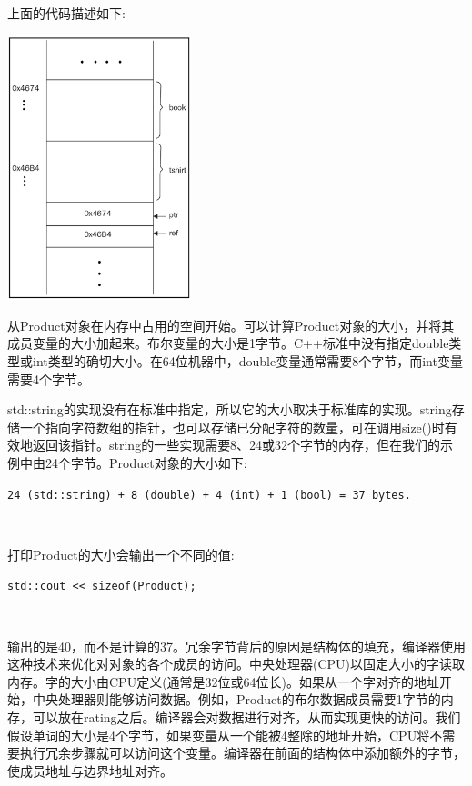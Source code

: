 上面的代码描述如下: \par

\begin{center}
	\includegraphics[width=0.4\textwidth]{content/Section-1/Chapter-3/2}
\end{center}

从Product对象在内存中占用的空间开始。可以计算Product对象的大小，并将其成员变量的大小加起来。布尔变量的大小是1字节。C++标准中没有指定double类型或int类型的确切大小。在64位机器中，double变量通常需要8个字节，而int变量需要4个字节。 \par
std::string的实现没有在标准中指定，所以它的大小取决于标准库的实现。string存储一个指向字符数组的指针，也可以存储已分配字符的数量，可在调用size()时有效地返回该指针。string的一些实现需要8、24或32个字节的内存，但在我们的示例中由24个字节。Product对象的大小如下:\par
	\texttt{24 (std::string) + 8 (double) + 4 (int) + 1 (bool) = 37 bytes.} \par

\noindent\textbf{}\ \par
打印Product的大小会输出一个不同的值: \par
	\texttt{std::cout << sizeof(Product);} \par
	
\noindent\textbf{}\ \par
输出的是40，而不是计算的37。冗余字节背后的原因是结构体的填充，编译器使用这种技术来优化对对象的各个成员的访问。中央处理器(CPU)以固定大小的字读取内存。字的大小由CPU定义(通常是32位或64位长)。如果从一个字对齐的地址开始，中央处理器则能够访问数据。例如，Product的布尔数据成员需要1字节的内存，可以放在rating之后。编译器会对数据进行对齐，从而实现更快的访问。我们假设单词的大小是4个字节，如果变量从一个能被4整除的地址开始，CPU将不需要执行冗余步骤就可以访问这个变量。编译器在前面的结构体中添加额外的字节，使成员地址与边界地址对齐。

